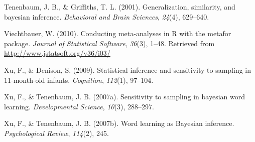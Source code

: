 \documentclass[english,floatsintext,man]{apa6}
\theoremstyle{definition}
\theoremstyle{definition}
\theoremstyle{remark}
\begin{document}
\hypertarget{ref-tenenbaum2001}{}
Tenenbaum, J. B., \& Griffiths, T. L. (2001). Generalization,
similarity, and bayesian inference. \emph{Behavioral and Brain
Sciences}, \emph{24}(4), 629--640.

\hypertarget{ref-R-metafor}{}
Viechtbauer, W. (2010). Conducting meta-analyses in R with the metafor
package. \emph{Journal of Statistical Software}, \emph{36}(3), 1--48.
Retrieved from \url{http://www.jstatsoft.org/v36/i03/}

\hypertarget{ref-xu2009}{}
Xu, F., \& Denison, S. (2009). Statistical inference and sensitivity to
sampling in 11-month-old infants. \emph{Cognition}, \emph{112}(1),
97--104.

\hypertarget{ref-xu2007b}{}
Xu, F., \& Tenenbaum, J. B. (2007a). Sensitivity to sampling in bayesian
word learning. \emph{Developmental Science}, \emph{10}(3), 288--297.

\hypertarget{ref-xu2007word}{}
Xu, F., \& Tenenbaum, J. B. (2007b). Word learning as Bayesian
inference. \emph{Psychological Review}, \emph{114}(2), 245.
\end{document}
